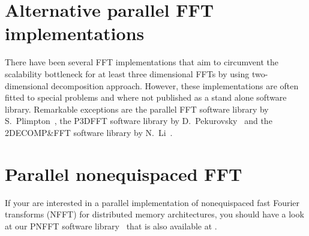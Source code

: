 \section{Alternative parallel FFT implementations}
There have been several FFT implementations that aim to circumvent the scalability bottleneck
for at least three dimensional FFTs by using two-dimensional decomposition approach.
However, these implementations are often fitted to special problems and where not published
as a stand alone software library. 
Remarkable exceptions are the parallel FFT software library by S.~Plimpton~\cite{Pl97,sandiafft},
the P3DFFT software library by D.~Pekurovsky~\cite{Pe12,p3dfft} and the \mbox{2DECOMP\&FFT} software library by N.~Li~\cite{Li2010, 2decompfft}.

\section{Parallel nonequispaced FFT}
If your are interested in a parallel implementation of nonequispaced fast Fourier
transforms (NFFT) for distributed memory architectures, you should have a look at our PNFFT software library~\cite{pnfft, PiPo13}
that is also available at \webpnfft.

